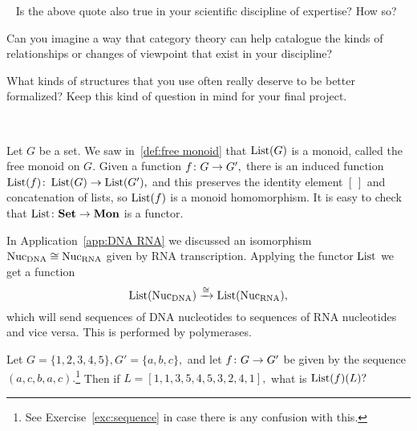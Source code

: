 \documentclass[../main/CT4S-EN-RU]{subfiles}
\begin{document}
\begin{remarkRUS}
\end{remarkRUS}

\begin{exerciseENG}~
\sexc Is the above quote also true in your scientific discipline of expertise? How so? 
\item Can you imagine a way that category theory can help catalogue the kinds of relationships or changes of viewpoint that exist in your discipline? 
\item What kinds of structures that you use often really deserve to be better formalized?
\endsexc
Keep this kind of question in mind for your final project.
\end{exerciseENG}

\begin{exerciseRUS}~
\end{exerciseRUS}

\begin{exampleENG}\label{ex:free monoid}
Let $G$ be a set. We saw in~\ref{def:free monoid} that $\operatorname{List}(G)$ is a monoid, called the free monoid on $G.$ Given a function $f\colon G\rightarrow G',$ there is an induced function $\operatorname{List}(f)\colon\operatorname{List}(G)\rightarrow\operatorname{List}(G'),$ and this preserves the identity element $[\,]$ and concatenation of lists, so $\operatorname{List}(f)$ is a monoid homomorphism. It is easy to check that $\operatorname{List}\colon{\mathbf{Set}}\rightarrow{\mathbf{Mon}}$ is a functor.
\end{exampleENG}

\begin{exampleRUS}\label{ex:free monoid}
\end{exampleRUS}

\begin{applicationENG}\label{app:polymerase}
In Application~\ref{app:DNA RNA} we discussed an isomorphism $\textnormal{Nuc}_\textnormal{DNA}\cong\textnormal{Nuc}_\textnormal{RNA}$ given by RNA transcription. Applying the functor $\operatorname{List}$ we get a function $$\operatorname{List}(\textnormal{Nuc}_\textnormal{DNA})\xrightarrow{\cong}\operatorname{List}(\textnormal{Nuc}_\textnormal{RNA}),$$ which will send sequences of DNA nucleotides to sequences of RNA nucleotides and vice versa. This is performed by polymerases.
\end{applicationENG}

\begin{applicationRUS}\label{app:polymerase}
\end{applicationRUS}

\begin{exerciseENG}\label{exc:list as functor}
Let $G=\{1,2,3,4,5\}, G'=\{a,b,c\},$ and let $f\colon G\rightarrow G'$ be given by the sequence $(a,c,b,a,c).$\footnote{See Exercise~\ref{exc:sequence} in case there is any confusion with this.} Then if $L=[1,1,3,5,4,5,3,2,4,1],$ what is $\operatorname{List}(f)(L)?$
\end{exerciseENG}
\end{document}
